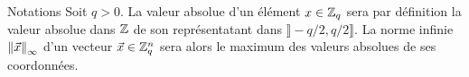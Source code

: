 \begin{section}{Notations}
Soit $q > 0$. La valeur absolue d'un élément $x \in \mathbb{Z}_q$
sera par définition la valeur absolue dans $\mathbb{Z}$ de son représentatant dans
$\rrbracket - q/2, q/2 \rrbracket$. 
	La norme infinie ${\|\vec{x}\|}_{\infty}$ d'un vecteur $\vec{x} \in \mathbb{Z}_q^n$ sera 
alors le maximum des valeurs absolues de ses coordonnées.
\end{section}
